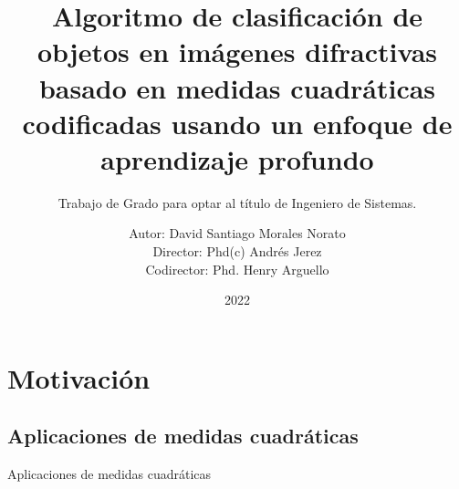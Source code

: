 \documentclass[aspectratio=169,t,xcolor=table]{beamer}
\begin{document}
\title[Inf UFG]{Algoritmo de clasificación de objetos en imágenes difractivas basado en medidas cuadráticas codificadas usando un enfoque de aprendizaje profundo}
\subtitle{Trabajo de Grado para optar al título de Ingeniero de Sistemas.}
\author{Autor: David Santiago Morales Norato \\ Director: Phd(c) Andrés Jerez \\ Codirector: Phd. Henry Arguello}

\date{\vspace{1cm}2022}
\frame[noframenumbering]{\titlepage}





\section{Motivación}
\subsection{Aplicaciones de medidas cuadráticas}
\begin{frame}{Aplicaciones de medidas cuadráticas }
    \centering
    \scriptsize
\end{frame}
\end{document}
